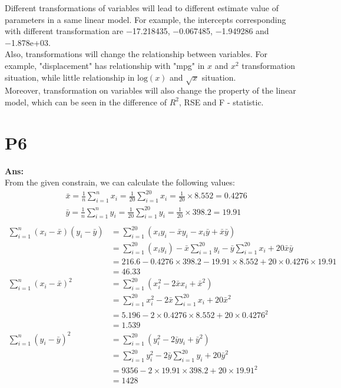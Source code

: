 \documentclass[twoside]{homework}
\begin{document}
Different transformations of variables will lead to different estimate value of parameters in a same linear model. For example, the intercepts corresponding with different transformation are −17.218435, −0.067485, −1.949286 and −1.878e+03. \\
Also, transformations will change the relationship between variables. For example, "displacement" has relationship with "mpg" in $x$ and $x^2$ transformation situation, while little relationship in $\mathrm{log}(x)$ and $\sqrt{x}$ situation.\\
Moreover, transformation on variables will also change the property of the linear model, which can be seen in the difference of $R^2$, RSE and F - statistic. 


\newpage

\section*{P6}
\textbf{Ans:}\\
From the given constrain, we can calculate the following values:\\
\begin{equation}
    \begin{aligned}
    &\bar{x} = \frac{1}{n} \sum_{i=1}^{n} x_i = \frac{1}{20} \sum_{i=1}^{20} x_i = \frac{1}{20} \times 8.552 = 0.4276\\
    &\bar{y} = \frac{1}{n} \sum_{i=1}^{n} y_i = \frac{1}{20} \sum_{i=1}^{20} y_i = \frac{1}{20} \times 398.2 = 19.91\\
    \end{aligned}
\end{equation}{}
\begin{equation}
    \begin{aligned}
    \sum_{i=1}^n (x_i - \bar{x}) (y_i - \bar{y}) &= \sum_{i=1}^{20} (x_i y_i - \bar{x} y_i - x_i \bar{y} + \bar{x}\bar{y})\\
    &= \sum_{i=1}^{20} (x_i y_i) - \bar{x} \sum_{i=1}^{20} y_i - \bar{y} \sum_{i=1}^{20} x_i + 20\bar{x}\bar{y}\\
    &= 216.6 - 0.4276\times 398.2 - 19.91\times 8.552 + 20 \times 0.4276 \times 19.91\\
    &= 46.33\\
    \sum_{i=1}^n (x_i - \bar{x})^2 &= \sum_{i=1}^{20} (x_i^2 - 2\bar{x} x_i  + \bar{x}^2)\\
    &= \sum_{i=1}^{20} x_i^2 - 2\bar{x} \sum_{i=1}^{20} x_i  + 20\bar{x}^2\\
    &= 5.196 - 2\times0.4276\times8.552 + 20\times0.4276^2\\
    &= 1.539\\
    \sum_{i=1}^n (y_i - \bar{y})^2 &= \sum_{i=1}^{20} (y_i^2 - 2\bar{y} y_i  + \bar{y}^2)\\
    &= \sum_{i=1}^{20} y_i^2 - 2\bar{y} \sum_{i=1}^{20} y_i  + 20\bar{y}^2\\
    &= 9356 - 2\times19.91\times398.2 + 20\times19.91^2\\
    &= 1428
    \end{aligned}
\end{equation}{}\\
\end{document}
